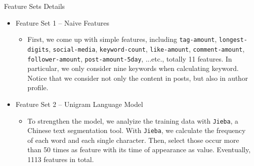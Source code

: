 \documentclass[final,hyperref={pdfpagelabels=false}]{beamer}
\begin{document}
\begin{frame}[t]
\begin{columns}[t]
\begin{column}{.465\textwidth}

\begin{block}{Feature Sets Details}

\begin{itemize}
\item Feature Set 1 -- Naive Features
	\begin{itemize}
		\item First, we come up with simple features, including \texttt{tag-amount}, \texttt{longest-digits}, \texttt{social-media}, \texttt{keyword-count}, \texttt{like-amount}, \texttt{comment-amount}, \texttt{follower-amount}, \texttt{post-amount-5day}, ...etc., totally 11 features. In particular, we only consider nine keywords when calculating keyword. Notice that we consider not only the content in posts, but also in author profile.  
	\end{itemize}
\item Feature Set 2 -- Unigram Language Model
	\begin{itemize}
		\item To strengthen the model, we analyize the training data with \texttt{Jieba}, a Chinese text segmentation tool. With \texttt{Jieba}, we calculate the frequency of each word and each single character. Then, select those occur more than 50 times as feature with its time of appearance as value. Eventually, 1113 features in total.
	\end{itemize}
\end{itemize}



\end{block}
\end{column}
\end{columns}
\end{frame}
\end{document}
